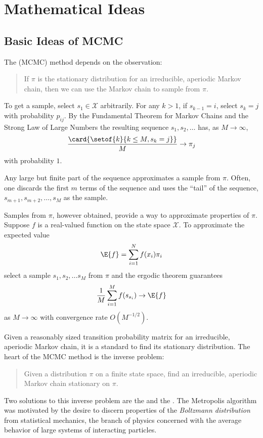 \documentclass[12pt]{article}
\begin{document}
\hr

\section*{Mathematical Ideas}

\subsection*{Basic Ideas of MCMC}

The  (MCMC)%
method depends on the observation:
\begin{quotation}
    If \( \pi \) is the stationary distribution for an irreducible,
    aperiodic Markov chain, then we can use the Markov chain to sample
    from \( \pi \).
\end{quotation}
To get a sample, select \( s_1 \in \mathcal{X} \) arbitrarily. For any \(
k > 1 \), if \( s_{k-1} = i \), select \( s_k = j \) with probability \(
p_{ij} \).  By the Fundamental Theorem for Markov Chains and the Strong
Law of Large Numbers the resulting sequence \( s_1, s_2, \dots \) has,
as \( M \to \infty \),
\[
    \frac{\card{\setof{k}{k \le M, s_k = j}}}{M} \to \pi_j
\] with probability \( 1 \).

Any large but finite part of the sequence approximates a sample from \(
\pi \).  Often, one discards the first \( m \) terms of the sequence and
uses the ``tail'' of the sequence, \( s_{m+1}, s_{m+2}, \dots, s_M \) as
the sample.

Samples from \( \pi \), however obtained, provide a way to approximate
properties of \( \pi \).  Suppose \( f \) is a real-valued function on
the state space \( \mathcal{X} \).  To approximate the expected value
\[
    \E{f} = \sum\limits_{i=1}^N f(x_i) \pi_i
\] select a sample \( s_1, s_2, \dots s_M \) from \( \pi \) and the
ergodic theorem guarantees
\[
    \frac{1}{M} \sum\limits_{i=1}^M f(s_{s_i}) \to \E{f}
\] as \( M \to \infty \) with convergence rate \( O(M^{-1/2}) \).

Given a reasonably sized transition probability matrix for an
irreducible, aperiodic Markov chain, it is a standard to find its
stationary distribution.  The heart of the MCMC method is the inverse
problem:
\begin{quotation}
    Given a distribution \( \pi \) on a finite state space, find an
    irreducible, aperiodic Markov chain stationary on \( \pi \).
\end{quotation}
Two solutions to this inverse problem are the 
and the .%
The Metropolis algorithm was motivated by the desire to discern
properties of the \emph{Boltzmann distribution} from statistical
mechanics, the branch of physics concerned with the average behavior of
large systems of interacting particles.
\end{document}
